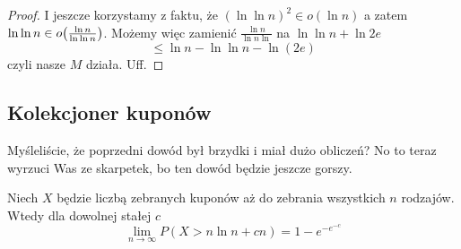 \begin{proof}
    I jeszcze korzystamy z faktu, że \( (\ln \ln n)^2 \in o(\ln n) \)
    a zatem \( \ln \ln n \in o\pars{\frac{\ln n}{\ln \ln n}} \).
    Możemy więc zamienić \( \frac{\ln n}{\ln n \ln} \) na \( \ln \ln n + \ln 2e \)
    \[
        \leq \ln n - \ln \ln n - \ln (2e)
    \]
    czyli nasze \( M \) działa. Uff.
\end{proof}

\subsection{Kolekcjoner kuponów}
Myśleliście, że poprzedni dowód był brzydki i miał dużo obliczeń?
No to teraz wyrzuci Was ze skarpetek, bo ten dowód będzie jeszcze gorszy.

\begin{theorem}
    Niech \( X \) będzie liczbą zebranych kuponów aż do zebrania wszystkich \( n \) rodzajów. Wtedy dla dowolnej stałej \( c \)
    \[
        \lim_{n \rightarrow \infty} P(X > n \ln n + cn) = 1 - e^{-e^{-c}}
    \]
\end{theorem}

